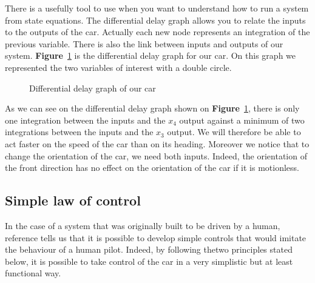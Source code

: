 There is a usefully tool to use when you want to understand
how to run a system from state equations. The differential delay
graph allows you to relate the inputs to the outputs of the car.
Actually each new node represents an integration of the previous variable. There is also the link between
inputs and outputs of our system. \textbf{Figure}~\ref{fig:diff_delay}
is the differential delay graph for our car. On this graph we represented
the two variables of interest with a double circle.

\begin{figure}[!ht]
    \centering
    \caption{Differential delay graph of our car}
    \label{fig:diff_delay}
\end{figure}


As we can see on the differential delay graph shown on \textbf{Figure}~\ref{fig:diff_delay},
there is only one integration between the inputs and the $x_4$ output against a
minimum of two integrations between the inputs and the $x_3$ output. We will therefore
be able to act faster on the speed of the car than on its heading. Moreover we
notice that to change the orientation of the car, we need both inputs. Indeed,
the orientation of the front direction has no effect on the orientation of the
car if it is motionless.

\subsection{Simple law of control}

In the case of a system that was originally built to be driven by a human, reference
\cite{robmooc} tells us that it is possible to develop simple controls that would
imitate the behaviour of a human pilot. Indeed, by following thetwo principles stated below,
it is possible to take control of the car in a very simplistic but at least functional way.

